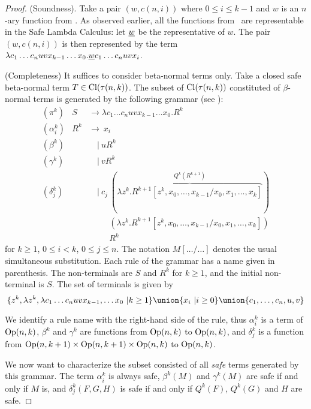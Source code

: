 \begin{proof}
  (Soundness). Take a pair $(w,c(n,i))$ where 
  $0\leq i\leq k-1$ and $w$ is an $n$-ary function from \safedefset.  
  As observed earlier, all the functions from \safedefset\ are representable 
  in the Safe Lambda Calculus: let $\underline{w}$ be the representative of $w$.
  The pair $(w,c(n,i))$ is then represented by the term
  $ \lambda c_1 \ldots c_n u v x_{k-1} \ldots x_0 . \underline{w} c_1\ldots c_n u v x_i$.
\smallskip

(Completeness) It suffices to consider beta-normal terms only.
Take a closed safe beta-normal term $T \in {\rm Cl}(\tau(n,k))$. 
The subset of ${\rm Cl}(\tau(n,k))$ constituted of $\beta$-normal terms is generated by the following grammar (see \cite{DBLP:journals/tcs/Zaionc87}):
\begin{eqnarray*}
  (\pi^k) &S &\rightarrow \lambda c_1 \ldots c_n u v x_{k-1} \ldots x_0 . R^k \\
  (\alpha_i^k) &R^k &\rightarrow\ x_i \\
  (\beta^k) && \quad|\  u R^k \\
  (\gamma^k) && \quad|\  v R^k \\
  (\delta^k_j) && \quad|\  c_j\ (\overbrace{\lambda z^k. R^{k+1}[z^k,x_0,\ldots, x_{k-1}/x_0,x_1, \ldots, x_k]}^{Q^k(R^{k+1})}) \\
  && \quad\  \quad \ (\lambda z^k. R^{k+1}[z^k,x_0,\ldots, x_{k-1}/x_0,x_1, \ldots, x_k]) \\
  && \quad\  \quad \ R^k
\end{eqnarray*}
for $k\geq 1$, $0\leq i< k$, $0\leq j\leq n$. The notation $M[\ldots/\ldots]$ denotes the usual simultaneous substitution.
Each rule of the grammar has a name given in parenthesis. The non-terminals are $S$ and $R^k$ for $k\geq1$, and the initial non-terminal is $S$.
The set of terminals is given by $$\{ z^k,  \lambda z^k, \lambda c_1 \ldots c_n u v x_{k-1}, \ldots x_0 ~| k\geq 1\} \union \{ x_i ~| i\geq 0 \} \union \{ c_1, \ldots, c_n, u, v \}$$

We identify a rule name with the right-hand side of the rule,
thus $\alpha_i^k$ is a term of ${\rm Op}(n,k)$,
$\beta^k$ and $\gamma^k$
are functions from ${\rm Op}(n,k)$ to ${\rm Op}(n,k)$, and
$\delta^k_j$ is a function from ${\rm Op}(n,k+1) \times {\rm Op}(n,k+1)
\times {\rm Op}(n,k)$ to ${\rm Op}(n,k)$.

We now want to characterize the subset consisted of all \emph{safe} terms generated by this grammar.
The term $\alpha_i^k$ is always safe, $\beta^k(M)$ and $\gamma^k(M)$ are safe if and only if $M$ is, and  $\delta^k_j(F,G,H)$ is safe if and only if $Q^k(F)$, $Q^k(G)$ and $H$ are safe.


\end{proof}
